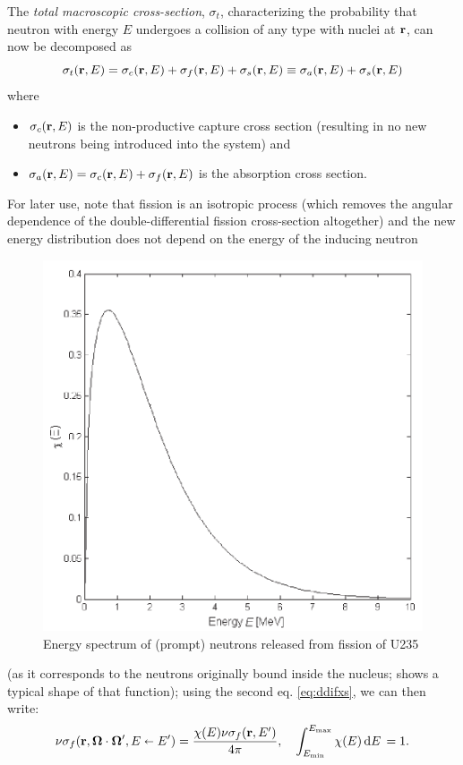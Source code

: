 The \textit{total macroscopic cross-section}, $\sigma_t$, characterizing the probability that neutron with energy $E$
undergoes a collision of any type with nuclei at $\mathbf{r}$, can now be decomposed as 
\begin{equation}\label{eq:st}
  \sigma_t(\mathbf{r},E) = \sigma_c(\mathbf{r},E) + \sigma_f(\mathbf{r},E) + \sigma_s(\mathbf{r},E) \equiv \sigma_a(\mathbf{r},E) + \sigma_s(\mathbf{r},E)
\end{equation}
where
\begin{itemize}
	\item $\sigma_c(\mathbf{r}, E)$ is the non-productive capture cross section (resulting in no new neutrons being introduced
	into the system) and
  	\item $\sigma_a(\mathbf{r}, E) = \sigma_c(\mathbf{r},E) + \sigma_f(\mathbf{r},E)$ is the absorption cross section.
\end{itemize}

For later use, note that fission is an isotropic process (which removes the angular dependence of the
double-differential fission cross-section altogether) and the new energy distribution does not depend on the energy of 
the inducing neutron 
\begin{figure}[hbt]
\begin{center}
  \includegraphics[scale=.6]{spectrum}
  \caption{Energy spectrum of (prompt) neutrons released from fission of U235}
  \label{fig:spectrum}
\end{center}
\end{figure}
(as it corresponds to the neutrons originally bound inside the nucleus; 
shows a typical shape of that function); using the second eq.
\eqref{eq:ddifxs}, we can then write:
\begin{equation}\label{eq:sf}
\nu\sigma_f(\mathbf{r},\mathbf{\Omega}\cdot\mathbf{\Omega}',E\shortleftarrow E') = \frac{\chi(E)\nu\sigma_f(\mathbf{r},E')}{4\pi},\quad 
\int_{E_{\text{min}}}^{E_{\text{max}}}\chi(E)\,\text{d}E\, = 1.
\end{equation}
 
